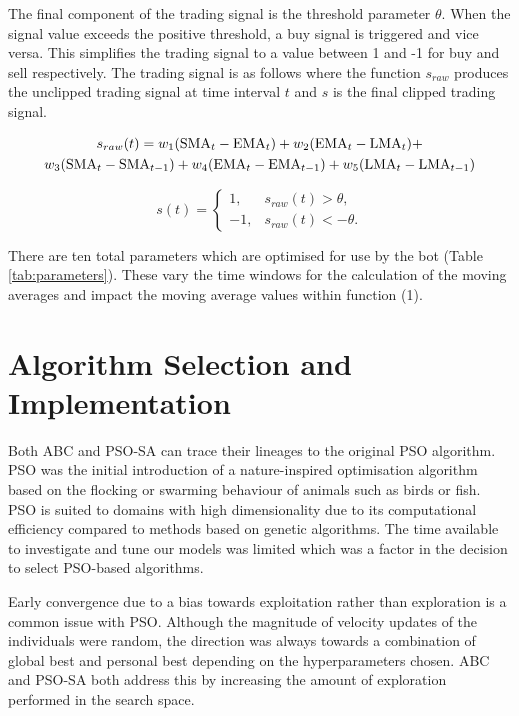 \documentclass[a4paper, 12pt]{extarticle}
\begin{document}
The final component of the trading signal is the threshold parameter $\theta$. When the signal value exceeds the positive threshold, a buy signal is triggered and vice versa. This simplifies the trading signal to a value between 1 and -1 for buy and sell respectively. The trading signal is as follows where the function $s_{raw}$ produces the unclipped trading signal at time interval $t$ and $s$ is the final clipped trading signal.

\begin{multline}
    $$ s_{raw}(t) = w_1(\text{SMA}_{t} - \text{EMA}_{t}) + w_2(\text{EMA}_{t} - \text{LMA}_{t}) + \\
    w_3(\text{SMA}_t - \text{SMA}_{t - 1}) + w_4(\text{EMA}_t - \text{EMA}_{t - 1}) + w_5(\text{LMA}_t - \text{LMA}_{t - 1}) $$
\end{multline}

\begin{equation}
s(t) = 
\begin{cases}
1,      & s_{raw}(t) > \theta,\\
-1,     & s_{raw}(t) < -\theta.
\end{cases}
\end{equation}

There are ten total parameters which are optimised for use by the bot (Table \ref{tab:parameters}). These vary the time windows for the calculation of the moving averages and impact the moving average values within function (1).

\section{Algorithm Selection and Implementation}
Both ABC and PSO-SA can trace their lineages to the original PSO algorithm. PSO was the initial introduction of a nature-inspired optimisation algorithm based on the flocking or swarming behaviour of animals such as birds or fish. PSO is suited to domains with high dimensionality due to its computational efficiency compared to methods based on genetic algorithms. The time available to investigate and tune our models was limited which was a factor in the decision to select PSO-based algorithms. 

Early convergence due to a bias towards exploitation rather than exploration is a common issue with PSO. Although the magnitude of velocity updates of the individuals were random, the direction was always towards a combination of global best and personal best depending on the hyperparameters chosen. ABC and PSO-SA both address this by increasing the amount of exploration performed in the search space. 
\end{document}
